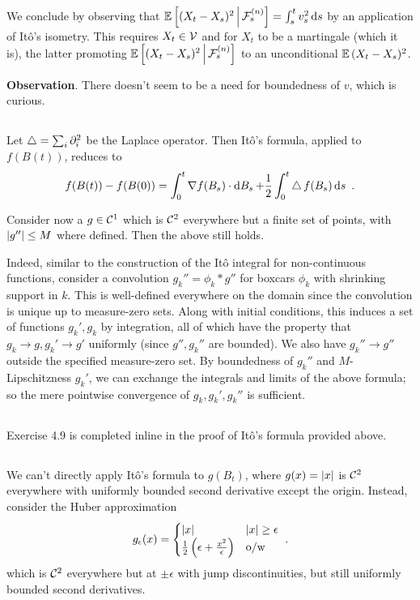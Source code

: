 \documentclass{article}
\begin{document}
We conclude by observing that \(\operatorname{\mathbb{E}}\left[ (X_t-X_s)^2 \,\middle|\, \mathcal{F}_s^{(n)} \right]=\int_s^tv_s^2\mathop{\mathrm{d} s }\) by an application of It\^{o}'s isometry. This requires \(X_t\in\mathcal{V}\) and for \(X_t\) to be a martingale (which it is), the latter promoting \(\operatorname{\mathbb{E}}\left[ (X_t-X_s)^2 \,\middle|\, \mathcal{F}_s^{(n)} \right]\) to an unconditional \(\operatorname{\mathbb{E}}{(X_t-X_s)^2}\).

  \textbf{Observation}. There doesn't seem to be a need for boundedness of \(v\), which is curious.

\subsection{} %

Let \(\operatorname{\bigtriangleup}=\sum_i\partial_i^2\) be the Laplace operator. Then It\^{o}'s formula, applied to \(f(B(t))\), reduces to
\[
  f(B(t))-f(B(0))=\int_0^t\nabla f(B_s)\cdot \mathop{\mathrm{d} B_s }+\frac{1}{2}\int_0^t\operatorname{\bigtriangleup} f(B_s)\mathop{\mathrm{d} s }\,\,.
  \]

  Consider now a \(g\in \mathcal{C}^1\) which is \(\mathcal{C}^2\) everywhere but a finite set of points, with \(\left\lvert{g''}\right\rvert\le M\) where defined. Then the above still holds.

  Indeed, similar to the construction of the It\^{o} integral for non-continuous functions, consider a convolution \(g_k''=\phi_k*g''\) for boxcars \(\phi_k\) with shrinking support in \(k\). This is well-defined everywhere on the domain since the convolution is unique up to measure-zero sets. Along with initial conditions, this induces a set of functions \(g_k',g_k\) by integration, all of which have the property that \(g_k\rightarrow g,g_k'\rightarrow g'\) uniformly (since \(g'',g_k''\) are bounded). We also have \(g_k''\rightarrow g''\) outside the specified measure-zero set. By boundedness of \(g_k''\) and \(M\)-Lipschitzness \(g_k'\), we can exchange the integrals and limits of the above formula; so the mere pointwise convergence of \(g_k,g_k',g_k''\) is sufficient.
\label{ex:discont}
  \subsection{} %
  
  Exercise 4.9 is completed inline in the proof of It\^{o}'s formula provided above.

  \subsection{} %

  We can't directly apply It\^{o}'s formula to \(g(B_t)\), where \(g(x)=\left\lvert{x}\right\rvert\) is \(\mathcal{C}^2\) everywhere with uniformly bounded second derivative except the origin. Instead, consider the Huber approximation
  \[
    g_\epsilon(x)=\begin{cases}
      \left\lvert{x}\right\rvert& \left\lvert{x}\right\rvert\ge \epsilon\\
      \frac{1}{2}\left({\epsilon + \frac{x^2}{\epsilon}}\right) & \text{o/w}
      \end{cases}\,\,.
    \]
    which is \(\mathcal{C}^2\) everywhere but at \(\pm\epsilon\) with jump discontinuities, but still uniformly bounded second derivatives.
\end{document}
